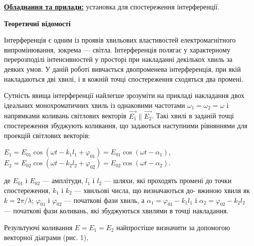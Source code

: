 \documentclass[12pt,a4paper]{article}
\begin{document}
    \textbf{\underline{Обладнання та прилади:}} установка для спостереження інтерференції.

    \vspace{1.5em}


    \begin{center}
        \textbf{\Large Теоретичні відомості}
    \end{center}

    \setlength{\parindent}{1.5em}

    Інтерференція є одним із проявів хвильових властивостей електромагнітного випромінювання,
    зокрема --- світла. Інтерференція полягає у характерному перерозподілі інтенсивностей у просторі при накладанні декількох
    хвиль за деяких умов. У даній роботі вивчається двопроменева інтерференція, при якій накладаються дві хвилі, і в кожній точці спостереження сходяться два промені.

    Сутність явища інтерференції найлегше зрозуміти на прикладі накладання двох ідеальних монохроматичних хвиль із однаковими частотами
    $\omega_1 = \omega_2 = \omega$ і напрямками коливань світлових векторів
    $\vec{E_1} \parallel \vec{E_2}$. Такі хвилі в заданій точці спостереження збуджують коливання, що задаються наступними рівняннями для проекцій світлових векторів:

    \begin{center}
        $E_1 = E_{01} \cos (\omega t - k_1 l_1 + \varphi_{01}) = E_{01} \cos (\omega t - \alpha_1)$,\\
        $E_2 = E_{02} \cos (\omega t - k_2 l_2 + \varphi_{02}) = E_{02} \cos (\omega t - \alpha_2)$.
    \end{center}

    де  $E_{01}$ і $E_{02}$ --- амплітуди, $l_1$ і $l_2$ --- шляхи, які
    проходять промені до точки спостереження, $k_1$ і $k_2$ --- хвильові числа, що визначаються до-
    вжиною хвиля як $k = 2\pi / \lambda$; $\varphi_{01}$ і $\varphi_{02}$ --- початкові фази хвиль, а
    $\alpha_1 = \varphi_{01} - k_1 l_1$ і $\alpha_2 = \varphi_{02} - k_2 l_2$ --- початкові фази коливань, які збуджуються
    хвилями в точці накладання.

    Результуючі коливання $E = E_1 = E_2$ найпростіше визначити за допомогою векторної діаграми (рис. 1),
\end{document}
